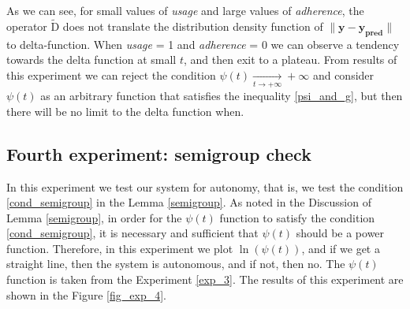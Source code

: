 \documentclass{article}
\begin{document}
        As we can see, for small values of \textit{usage} and large values of \textit{adherence}, the operator $\widetilde{\text{D}}$ does not translate the distribution density function of $\|\mathbf{y} - \mathbf{y_{\text{pred}}}\|$ to delta-function. When \textit{usage} = 1 and \textit{adherence} = 0 we can observe a tendency towards the delta function at small $t$, and then exit to a plateau. From results of this experiment we can reject the condition $\psi(t) \underset{t \to +\infty}{\longrightarrow} +\infty$ and consider $\psi(t)$ as an arbitrary function that satisfies the inequality \eqref{psi_and_g}, but then there will be no limit to the delta function when.

    \subsection{Fourth experiment: semigroup check} \label{exp_4}

        In this experiment we test our system for autonomy, that is, we test the condition \eqref{cond_semigroup} in the Lemma \ref{semigroup}. As noted in the Discussion of Lemma \ref{semigroup}, in order for the $\psi(t)$ function to satisfy the condition \eqref{cond_semigroup}, it is necessary and sufficient that $\psi(t)$ should be a power function. Therefore, in this experiment we plot $\ln(\psi(t))$, and if we get a straight line, then the system is autonomous, and if not, then no. The $\psi(t)$ function is taken from the Experiment \ref{exp_3}. The results of this experiment are shown in the Figure \ref{fig_exp_4}.
\end{document}
